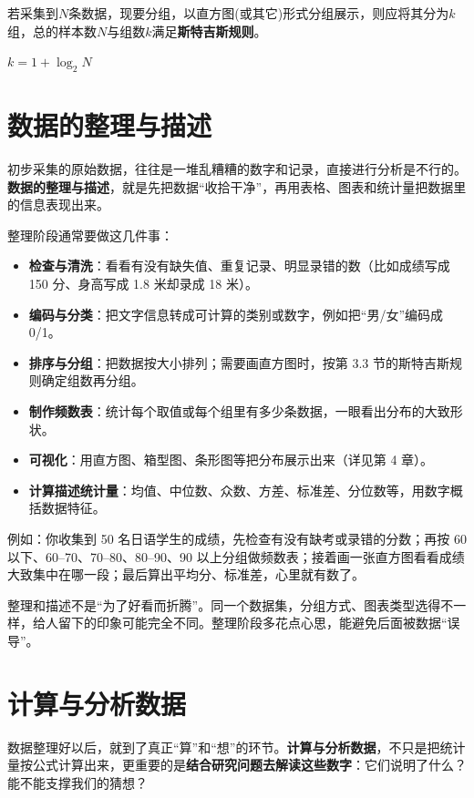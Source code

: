 \documentclass[lang=cn,10pt]{elegantbook}
\begin{document}
若采集到$N$条数据，现要分组，以直方图(或其它)形式分组展示，则应将其分为$k$组，总的样本数$N$与组数$k$满足\textbf{斯特吉斯规则}。

\begin{theorem}  
    \begin{center}
      $k = 1 + \log_2 N$
    \end{center}   

\end{theorem}


\section{数据的整理与描述}
初步采集的原始数据，往往是一堆乱糟糟的数字和记录，直接进行分析是不行的。\textbf{数据的整理与描述}，就是先把数据“收拾干净”，再用表格、图表和统计量把数据里的信息表现出来。

整理阶段通常要做这几件事：
\begin{itemize}
  \item \textbf{检查与清洗}：看看有没有缺失值、重复记录、明显录错的数（比如成绩写成 150 分、身高写成 1.8 米却录成 18 米）。
  \item \textbf{编码与分类}：把文字信息转成可计算的类别或数字，例如把“男/女”编码成 0/1。
  \item \textbf{排序与分组}：把数据按大小排列；需要画直方图时，按第 3.3 节的斯特吉斯规则确定组数再分组。
  \item \textbf{制作频数表}：统计每个取值或每个组里有多少条数据，一眼看出分布的大致形状。
  \item \textbf{可视化}：用直方图、箱型图、条形图等把分布展示出来（详见第 4 章）。
  \item \textbf{计算描述统计量}：均值、中位数、众数、方差、标准差、分位数等，用数字概括数据特征。
\end{itemize}

例如：你收集到 50 名日语学生的成绩，先检查有没有缺考或录错的分数；再按 60 以下、60--70、70--80、80--90、90 以上分组做频数表；接着画一张直方图看看成绩大致集中在哪一段；最后算出平均分、标准差，心里就有数了。

\begin{remark}
整理和描述不是“为了好看而折腾”。同一个数据集，分组方式、图表类型选得不一样，给人留下的印象可能完全不同。整理阶段多花点心思，能避免后面被数据“误导”。
\end{remark}



\section{计算与分析数据}
数据整理好以后，就到了真正“算”和“想”的环节。\textbf{计算与分析数据}，不只是把统计量按公式计算出来，更重要的是\textbf{结合研究问题去解读这些数字}：它们说明了什么？能不能支撑我们的猜想？
\end{document}
